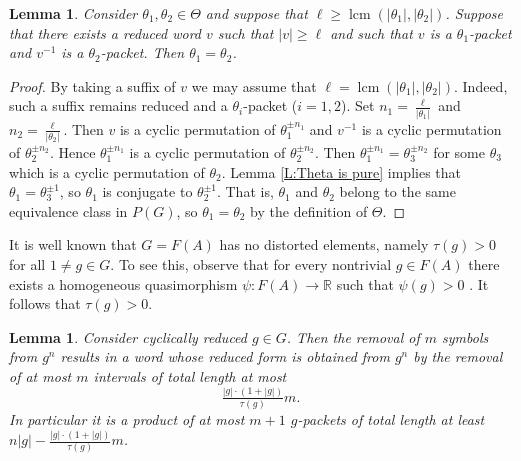 \documentclass[12pt]{amsart}
\newtheorem{lemma}[prop]{Lemma}
\theoremstyle{definition}
\def\RR{\ensuremath{\mathbb{R}}}
\newcommand{\OP}[1]{\operatorname{#1}}
\def\Free{F}
\begin{document}
\begin{lemma}\label{L:equal packets equal words}
Consider $\theta_1, \theta_2 \in \Theta$ and suppose that $\ell \geq \OP{lcm}(|\theta_1|,|\theta_2|)$.
Suppose that there exists a reduced word $v$ such that $|v| \geq \ell$ and such that $v$ is a $\theta_1$-packet and $v^{-1}$ is a $\theta_2$-packet.
Then $\theta_1=\theta_2$.
\end{lemma}

\begin{proof}
By taking a suffix of $v$ we may assume that $\ell=\OP{lcm}(|\theta_1|,|\theta_2|)$.
Indeed, such a suffix remains reduced and a $\theta_i$-packet ($i=1,2$).
Set $n_1=\tfrac{\ell}{|\theta_1|}$ and $n_2=\tfrac{\ell}{|\theta_2|}$. 
Then $v$ is a cyclic permutation of $\theta_1^{\pm n_1}$ and $v^{-1}$ is a cyclic permutation of $\theta_2^{\pm n_2}$.
Hence $\theta_1^{\pm n_1}$ is a cyclic permutation of $\theta_2^{\pm n_2}$.
Then $\theta_1^{\pm n_1} = \theta_3^{\pm n_2}$ for some $\theta_3$ which is a cyclic permutation of $\theta_2$.
Lemma \ref{L:Theta is pure} implies that $\theta_1=\theta_3^{\pm 1}$, so $\theta_1$ is conjugate to $\theta_2^{\pm 1}$.
That is, $\theta_1$ and $\theta_2$ belong to the same equivalence class in $P(G)$, so $\theta_1=\theta_2$ by the definition of $\Theta$.
\end{proof}



It is well known that $G=\Free(A)$ has no distorted elements, namely $\tau(g)>0$ for all $1 \neq g \in G$.
To see this, observe that for every nontrivial $g\in \Free(A)$ there exists a homogeneous quasimorphism
$\psi\colon \Free(A)\to \RR$ such that $\psi(g)>0$ \cite[Section 4.E]{MR3426433}. It follows that $\tau(g)>0$.



\begin{lemma}\label{L:small intervals reduction}
Consider cyclically reduced $g \in G$.
Then the removal of $m$ symbols from $g^n$ results in a  word whose reduced form is obtained from $g^n$ by the removal of at most $m$ intervals of total length at most
\[
\tfrac{|g| \cdot (1+|g|)}{\tau(g)} m.
\]
In particular it is a product of at most $m+1$ $g$-packets of total length at least $n|g|-\tfrac{|g|\cdot(1+|g|)}{\tau(g)} m$.
\end{lemma}
\end{document}
